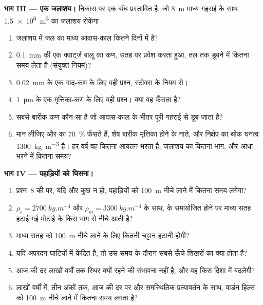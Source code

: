 \begin{problem}
\medskip
\noindent\textbf{भाग III --- एक जलाशय।}
निकास पर एक बाँध प्रस्तावित है, जो \qty{8}{m} माध्य गहराई के साथ \qty{1.5e6}{m^3} का जलाशय रोकेगा।
\begin{enumerate}[resume]
  \item जलाशय में जल का माध्य आवास-काल कितने दिनों में है?
  \item \qty{0.1}{mm} की एक क्वार्ट्ज बालू का कण, सतह पर प्रवेश करता हुआ, तल तक डूबने में कितना समय लेता है (संयुक्त नियम)?
  \item \qty{0.02}{mm} के एक गाद-कण के लिए वही प्रश्न, स्टोक्स के नियम से।
  \item \qty{1}{\micro m} के एक मृत्तिका-कण के लिए वही प्रश्न। क्या वह फँसता है?
  \item सबसे बारीक कण कौन-सा है जो आवास-काल के भीतर पूरी गहराई से डूब जाता है?
  \item मान लीजिए  और  का \qty{70}{\percent} फँसते हैं, शेष बारीक मृत्तिका होने के नाते, और निक्षेप का थोक घनत्व \qty{1300}{kg.m^{-3}} है। हर वर्ष वह कितना आयतन भरता है, जलाशय का कितना भाग, और आधा भरने में कितना समय?
\end{enumerate}

\medskip
\noindent\textbf{भाग IV --- पहाड़ियों को घिसना।}
\begin{enumerate}[resume]
  \item प्रश्न~8 की  पर, यदि और कुछ न हो, पहाड़ियों को \qty{100}{m} नीचे लाने में कितना समय लगेगा?
  \item $\rho_c = \qty{2700}{kg.m^{-3}}$ और $\rho_m =
        \qty{3300}{kg.m^{-3}}$ के साथ,  के समायोजित होने पर माध्य सतह हटाई गई मोटाई के किस भाग से नीचे आती है?
  \item माध्य सतह को \qty{100}{m} नीचे लाने के लिए कितनी चट्टान हटानी होगी?
  \item यदि अपरदन घाटियों में केंद्रित है, तो उस समय के दौरान सबसे ऊँचे शिखरों का क्या होता है?
  \item आज की दर लाखों वर्षों तक स्थिर क्यों रहने की संभावना नहीं है, और वह किस दिशा में बदलेगी?
  \item लाखों वर्षों में, तीन अंकों तक, आज की दर पर और समस्थितिक प्रत्यावर्तन के साथ, वार्डन हिल्स को \qty{100}{m} नीचे लाने में कितना समय लगता है?
\end{enumerate}
\end{problem}
